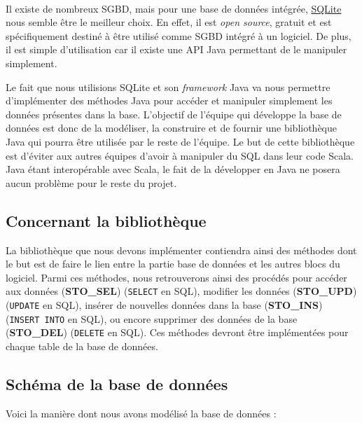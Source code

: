 \paragraph{}
Il existe de nombreux SGBD, mais pour une base de données intégrée,
\href{https://sqlite.org/index.html}{SQLite} nous semble être le meilleur
choix. En effet, il est \textit{open source}, gratuit et est spécifiquement
destiné à être utilisé comme SGBD intégré à un logiciel. De plus, il est
simple d’utilisation car il existe une API Java permettant de le manipuler
simplement.

Le fait que nous utilisions SQLite et son
\textit{framework} Java va nous permettre d’implémenter des méthodes Java pour
accéder et manipuler simplement les données présentes dans la base. L’objectif
de l’équipe qui développe la base de données est donc de la modéliser, la
construire et de fournir une bibliothèque Java qui pourra être utilisée par le
reste de l’équipe. Le but de cette bibliothèque est d’éviter aux autres équipes
d’avoir à manipuler du SQL dans leur code Scala. Java étant interopérable avec
Scala, le fait de la développer en Java ne posera aucun problème pour le reste
du projet.

\subsection{Concernant la bibliothèque}

La bibliothèque que nous devons implémenter contiendra ainsi des méthodes dont
le but est de faire le lien entre la partie base de données et les autres
blocs du logiciel. Parmi ces méthodes, nous retrouverons ainsi des procédés
pour accéder aux données (\textbf{STO\_SEL}) (\texttt{SELECT} en SQL),
modifier les données (\textbf{STO\_UPD}) (\texttt{UPDATE} en SQL), insérer de
nouvelles données dans la base (\textbf{STO\_INS}) (\texttt{INSERT INTO} en
SQL), ou encore supprimer des données de la base (\textbf{STO\_DEL})
(\texttt{DELETE} en SQL). Ces méthodes devront être implémentées pour chaque
table de la base de données.

\subsection{Schéma de la base de données}

Voici la manière dont nous avons modélisé la base de données :

\paragraph{}

